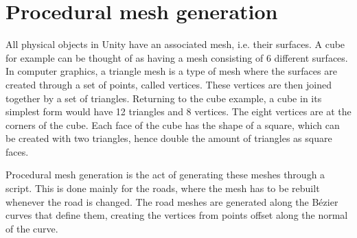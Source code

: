 \section{Procedural mesh generation}\label{mesh-generation}
    All physical objects in Unity have an associated mesh, i.e. their surfaces. A cube for example can be thought of as having a mesh consisting of 6 different surfaces. In computer graphics, a triangle mesh is a type of mesh where the surfaces are created through a set of points, called vertices. These vertices are then joined together by a set of triangles. Returning to the cube example, a cube in its simplest form would have 12 triangles and 8 vertices. The eight vertices are at the corners of the cube. Each face of the cube has the shape of a square, which can be created with two triangles, hence double the amount of triangles as square faces.

    Procedural mesh generation is the act of generating these meshes through a script. This is done mainly for the roads, where the mesh has to be rebuilt whenever the road is changed. The road meshes are generated along the Bézier curves that define them, creating the vertices from points offset along the normal of the curve.